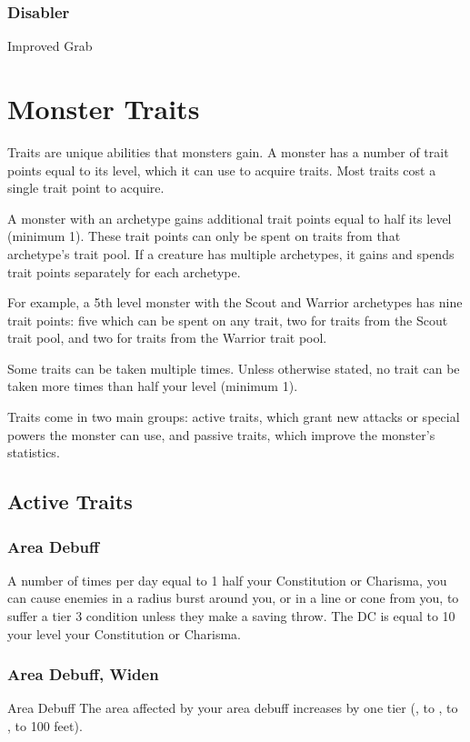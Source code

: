 \subsubsection{Disabler}
\begin{itemize*}
    \item Improved Grab
\end{itemize*}

\section{Monster Traits}
Traits are unique abilities that monsters gain. A monster has a number of trait points equal to its level, which it can use to acquire traits. Most traits cost a single trait point to acquire.

A monster with an archetype gains additional trait points equal to half its level (minimum 1). These trait points can only be spent on traits from that archetype's trait pool. If a creature has multiple archetypes, it gains and spends trait points separately for each archetype.

For example, a 5th level monster with the Scout and Warrior archetypes has nine trait points: five which can be spent on any trait, two for traits from the Scout trait pool, and two for traits from the Warrior trait pool.

Some traits can be taken multiple times. Unless otherwise stated, no trait can be taken more times than half your level (minimum 1).

Traits come in two main groups: active traits, which grant new attacks or special powers the monster can use, and passive traits, which improve the monster's statistics.

\subsection{Active Traits}

\subsubsection{Area Debuff}
\featben A number of times per day equal to 1 \add half your Constitution or Charisma, you can cause enemies in a \areasmall radius burst around you, or in a \areamed line or cone from you, to suffer a tier 3 condition unless they make a saving throw. The DC is equal to 10 \add your level \add your Constitution or Charisma.

\subsubsection{Area Debuff, Widen}
\featpre Area Debuff
\featben The area affected by your area debuff increases by one tier (\areasmall, to \areamed, to \arealarge, to 100 feet).

